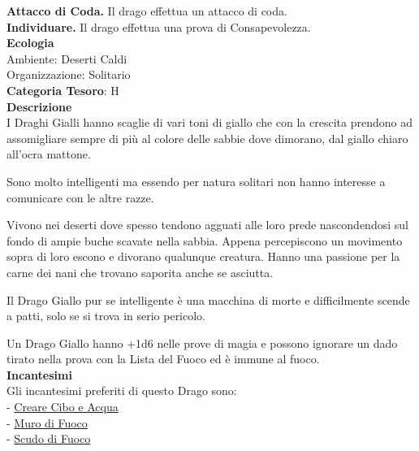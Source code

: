 \begin{multicols}{2}
{\textbf{Attacco di Coda.} Il drago effettua un attacco di coda.\\
\textbf{Individuare.} Il drago effettua una prova di Consapevolezza.\\
\textbf{Ecologia}\\
Ambiente: Deserti Caldi\\
Organizzazione: Solitario\\
\textbf{Categoria Tesoro}: H\\
\textbf{Descrizione}\\
I Draghi Gialli hanno scaglie di vari toni di giallo che con la crescita prendono ad assomigliare sempre di più al colore delle sabbie dove dimorano, dal giallo chiaro all'ocra mattone.

Sono molto intelligenti ma essendo per natura solitari non hanno interesse a comunicare con le altre razze.

Vivono nei deserti dove spesso tendono agguati alle loro prede nascondendosi sul fondo di ampie buche scavate nella sabbia.
Appena percepiscono un movimento sopra di loro escono e divorano qualunque creatura.
Hanno una passione per la carne dei nani che trovano saporita anche se asciutta.

Il Drago Giallo pur se intelligente è una macchina di morte e difficilmente scende a patti, solo se si trova in serio pericolo.

Un Drago Giallo hanno +1d6 nelle prove di magia e possono ignorare un dado tirato nella prova con la Lista del Fuoco ed è immune al fuoco.
\\
\textbf{Incantesimi}\\
Gli incantesimi preferiti di questo Drago sono:\\
- \hyperlink{Creare Cibo e Acqua}{Creare Cibo e Acqua}\\
- \hyperlink{Muro di Fuoco}{Muro di Fuoco}\\
- \hyperlink{Scudo di Fuoco}{Scudo di Fuoco}

}
\end{multicols}
